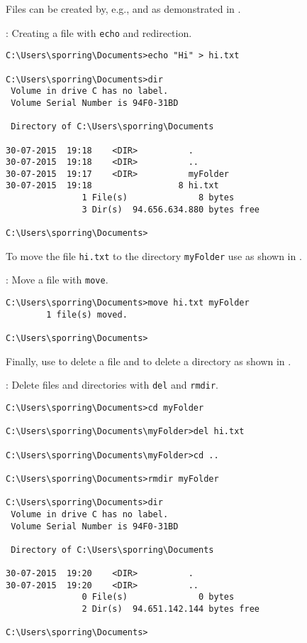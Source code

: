 Files can be created by, e.g.,  and  as demonstrated in .
\begin{codeNOutput}[label=windowsEcho]{: Creating a file with \lstinline[language=console]{echo} and redirection.}
  \begin{lstlisting}[language=console,escapechar=§]
C:\Users\sporring\Documents>echo "Hi" > hi.txt

C:\Users\sporring\Documents>dir
 Volume in drive C has no label.
 Volume Serial Number is 94F0-31BD

 Directory of C:\Users\sporring\Documents

30-07-2015  19:18    <DIR>          .
30-07-2015  19:18    <DIR>          ..
30-07-2015  19:17    <DIR>          myFolder
30-07-2015  19:18                 8 hi.txt
               1 File(s)              8 bytes
               3 Dir(s)  94.656.634.880 bytes free

C:\Users\sporring\Documents>
\end{lstlisting}
\end{codeNOutput}
To move the file \lstinline[language=console]{hi.txt} to the directory \lstinline[language=console]{myFolder} use  as shown in .
\begin{codeNOutput}[label=windowsMove]{: Move a file with \lstinline[language=console]{move}.}
  \begin{lstlisting}[language=console,escapechar=§]
C:\Users\sporring\Documents>move hi.txt myFolder
        1 file(s) moved.

C:\Users\sporring\Documents>
\end{lstlisting}
\end{codeNOutput}
Finally, use  to delete a file and  to delete a directory as shown in .
\begin{codeNOutput}[label=windowsDel]{: Delete files and directories with \lstinline[language=console]{del} and \lstinline[language=console]{rmdir}.}
  \begin{lstlisting}[language=console,escapechar=§]
C:\Users\sporring\Documents>cd myFolder

C:\Users\sporring\Documents\myFolder>del hi.txt

C:\Users\sporring\Documents\myFolder>cd ..

C:\Users\sporring\Documents>rmdir myFolder

C:\Users\sporring\Documents>dir
 Volume in drive C has no label.
 Volume Serial Number is 94F0-31BD

 Directory of C:\Users\sporring\Documents

30-07-2015  19:20    <DIR>          .
30-07-2015  19:20    <DIR>          ..
               0 File(s)              0 bytes
               2 Dir(s)  94.651.142.144 bytes free

C:\Users\sporring\Documents>
\end{lstlisting}
\end{codeNOutput}
